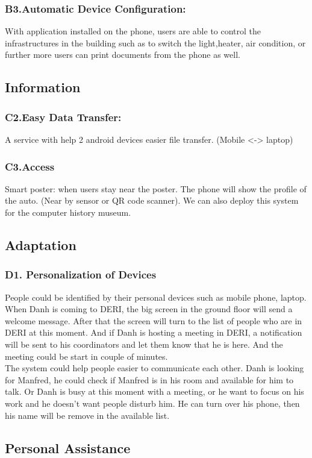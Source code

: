 \documentclass[a4paper]{llncs}
\begin{document}
\subsubsection{B3.Automatic Device Configuration:}
With application installed on the phone, users are able to control the infrastructures in the building such as  to switch the light,heater, air condition, or further more users can print documents from the phone as well.
\subsection{Information}
\subsubsection{C2.Easy Data Transfer: }
A service with help 2 android devices easier file transfer. (Mobile <-> laptop) 
\subsubsection{C3.Access}
Smart poster: when users stay near the poster. The phone will show the profile of the auto. (Near by sensor or QR code scanner). We can also deploy this system for the computer history museum.
\subsection{Adaptation}
\subsubsection{D1. Personalization of Devices}
People could be identified by their personal devices such as mobile phone, laptop. When Danh is coming to DERI, the big screen in the ground floor will send a welcome message. After that the screen will turn to the list of people who are in DERI at this moment. And if Danh is hosting a meeting in DERI, a notification will be sent to his coordinators and let them know that he is here. And the meeting could be start in couple of minutes.\\
The system could help people easier to communicate each other. Danh is looking for Manfred, he could check if Manfred is in his room and available for him to talk. Or Danh is busy at this moment with a  meeting, or he want to focus on his work and he doesn't want people disturb him. He can turn over his phone, then his name will be remove in the available list.\\
\subsection{Personal Assistance}
\end{document}
